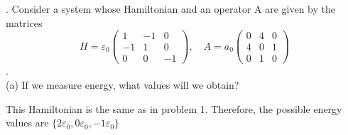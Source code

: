 \documentclass[a4paper, 11pt]{article}
\newenvironment{solution}{%
	\begin{list}{}{%
			\setlength{\topsep}{0pt}%
			\setlength{\leftmargin}{1.5cm}%
			\setlength{\rightmargin}{1.5cm}%
			\setlength{\listparindent}{\parindent}%
			\setlength{\itemindent}{\parindent}%
			\setlength{\parsep}{\parskip}%
		}%
		\item[]}{\end{list}}
\begin{document}
. Consider a system whose Hamiltonian and an operator A are given by the matrices\\ $$H = \varepsilon_0\begin{pmatrix}1 & -1 & 0 \\ -1 & 1 & 0 \\ 0 & 0 & -1\end{pmatrix}, \quad A=a_0\begin{pmatrix}0 & 4 & 0 \\ 4 & 0 & 1 \\ 0 & 1 & 0\end{pmatrix}$$.\\

\noindent(a) If we measure energy, what values will we obtain? 
	\begin{solution}
		This Hamiltonian is the same as in problem 1. Therefore, the possible energy values are $\{2\varepsilon_0, 0\varepsilon_0, -1\varepsilon_0 \}$ \\ 
	\end{solution}
\end{document}
